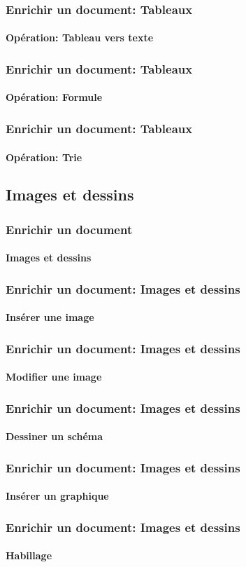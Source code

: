 \documentclass[xcolor=table]{beamer}
\begin{document}
\begin{frame}
\frametitle{Enrichir un document: Tableaux}
\framesubtitle{Opération: Tableau vers texte}

\end{frame}

\begin{frame}
\frametitle{Enrichir un document: Tableaux}
\framesubtitle{Opération: Formule}

\end{frame}

\begin{frame}
\frametitle{Enrichir un document: Tableaux}
\framesubtitle{Opération: Trie}

\end{frame}


\subsection{Images et dessins}

\begin{frame}
\frametitle{Enrichir un document}
\framesubtitle{Images et dessins}

\end{frame}

\begin{frame}
\frametitle{Enrichir un document: Images et dessins}
\framesubtitle{Insérer une image}

\end{frame}

\begin{frame}
\frametitle{Enrichir un document: Images et dessins}
\framesubtitle{Modifier une image}

\end{frame}

\begin{frame}
\frametitle{Enrichir un document: Images et dessins}
\framesubtitle{Dessiner un schéma}

\end{frame}

\begin{frame}
\frametitle{Enrichir un document: Images et dessins}
\framesubtitle{Insérer un graphique}

\end{frame}

\begin{frame}
\frametitle{Enrichir un document: Images et dessins}
\framesubtitle{Habillage}

\end{frame}
\end{document}
